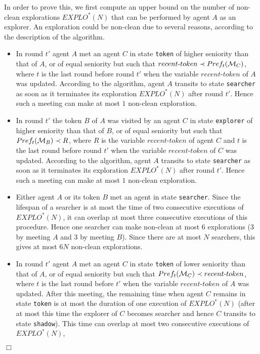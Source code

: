 \documentclass[11pt]{article}
\newcommand{\qed}{\hfill $\Box$ \bigbreak}
\newenvironment{proof}{\noindent {\bf Proof.}}{\qed}
\newcommand{\cM}{{\cal M}}
\begin{document}
\begin{proof}
 {In order to prove this, we first compute an upper bound on the number of non-clean explorations $EXPLO^*(N)$ that can be performed by agent $A$ as an explorer. An exploration could be non-clean due to several reasons,
 according to the description of the algorithm.}
 \begin{itemize}
 \item
{{In round $t'$} agent $A$ met an agent $C$ in state {\tt token} of higher seniority than that of $A$, or of equal seniority but such
  that $recent\mbox{-}token\prec Pref_t( \cM_C)$, {where $t$ is the last round before round $t'$ when the variable $recent$-$token$ of $A$ was updated}. According to the algorithm, agent $A$ transits to state {\tt searcher} as soon as it terminates its exploration $EXPLO^*(N)$ after round $t'$. Hence such a meeting can make at most $1$ non-clean exploration.}
 \item
{In round $t'$ the token $B$ of $A$ was visited  by an agent $C$ in state {\tt explorer} of higher seniority than that of $B$,
     or of equal seniority but such that {$Pref_t(\cM_B) \prec R$}, where $R$ is the variable $recent$-$token$ of agent $C$ and $t$ is the last round before round $t'$ when the variable $recent$-$token$ of $C$ was updated. According to the algorithm, agent $A$ transits to state {\tt searcher} as soon as it terminates its exploration $EXPLO^*(N)$ after round $t'$. Hence such a meeting can make at most $1$ non-clean exploration.}
  \item
  Either agent $A$ or its token $B$ met an agent in state {\tt searcher}. Since the lifespan of a searcher is at most the time of two consecutive executions of 
  $EXPLO^*(N)$, it can overlap at most three consecutive executions of this procedure. Hence one searcher can make non-clean at most 6 explorations 
  (3 by meeting $A$ and 3 by meeting $B$). Since there are at most $N$ searchers, this gives at most $6N$ non-clean explorations. 
   \item
 {In round $t'$} agent $A$ met an agent $C$  in state {\tt token} of lower seniority than that of $A$, or of equal seniority but such that {$ Pref_t(\cM_C) \prec recent\mbox{-}token$, where $t$ is the last round before $t'$ when the variable $recent$-$token$ of $A$ was updated}. After this meeting,
   the remaining time when agent $C$ remains in state {\tt token} is at most the duration of one execution of $EXPLO^*(N)$ (after at most this time the explorer of $C$ becomes searcher and hence $C$ transits to state {\tt shadow}). This time can overlap at most two consecutive executions of  $EXPLO^*(N)$,

\end{itemize}
\end{proof}
\end{document}
